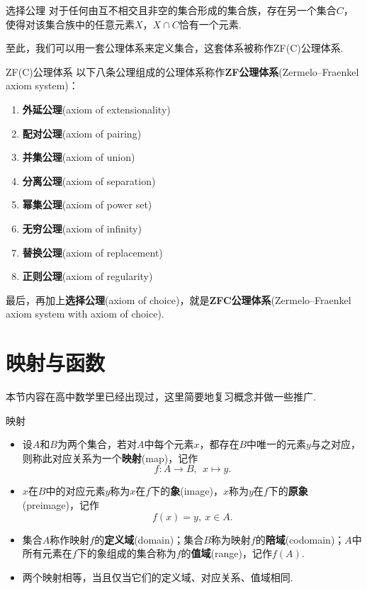 \documentclass[lang=cn, zihao=5]{elegantbook}
\begin{document}
\begin{axiom}{选择公理}
	对于任何由互不相交且非空的集合形成的集合族，存在另一个集合$C$，使得对该集合族中的任意元素$X$，$X \cap C$恰有一个元素.
\end{axiom}

至此，我们可以用一套公理体系来定义集合，这套体系被称作ZF(C)公理体系.

\begin{definition}{ZF(C)公理体系}
	以下八条公理组成的公理体系称作\textbf{ZF公理体系}(Zermelo–Fraenkel axiom system)：
	\begin{enumerate}
		\item \textbf{外延公理}(axiom of extensionality)
		\item \textbf{配对公理}(axiom of pairing)
		\item \textbf{并集公理}(axiom of union)
		\item \textbf{分离公理}(axiom of separation)
		\item \textbf{幂集公理}(axiom of power set)
		\item \textbf{无穷公理}(axiom of infinity)
		\item \textbf{替换公理}(axiom of replacement)
		\item \textbf{正则公理}(axiom of regularity)
	\end{enumerate}
	最后，再加上\textbf{选择公理}(axiom of choice)，就是\textbf{ZFC公理体系}(Zermelo–Fraenkel axiom system with axiom of choice).
\end{definition}

\section{映射与函数}

本节内容在高中数学里已经出现过，这里简要地复习概念并做一些推广.

\begin{definition}{映射}
	\begin{itemize}
		\item 设$A$和$B$为两个集合，若对$A$中每个元素$x$，都存在$B$中唯一的元素$y$与之对应，则称此对应关系为一个\textbf{映射}(map)，记作$$f:A \to B,~~x \mapsto y.$$
		\item $x$在$B$中的对应元素$y$称为$x$在$f$下的\textbf{象}(image)，$x$称为$y$在$f$下的\textbf{原象}(preimage)，记作$$f(x) = y,~ x \in A.$$
		\item 集合$A$称作映射$f$的\textbf{定义域}(domain)；集合$B$称为映射$f$的\textbf{陪域}(codomain)；$A$中所有元素在$f$下的象组成的集合称为$f$的\textbf{值域}(range)，记作$f(A)$.
		\item 两个映射相等，当且仅当它们的定义域、对应关系、值域相同.
	\end{itemize}
\end{definition}
\end{document}
